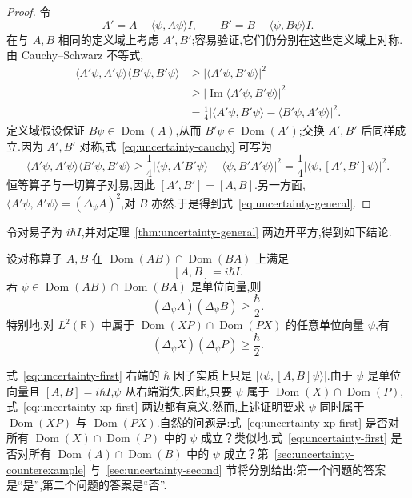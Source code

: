 \begin{proof}
令
\[
A'=A-\langle\psi,A\psi\rangle I,
\qquad
B'=B-\langle\psi,B\psi\rangle I.
\]
在与 $A,B$ 相同的定义域上考虑 $A',B'$;容易验证,它们仍分别在这些定义域上对称.由 Cauchy--Schwarz 不等式,
\begin{align}
\langle A'\psi,A'\psi\rangle\langle B'\psi,B'\psi\rangle
&\geq |\langle A'\psi,B'\psi\rangle|^2 \\
&\geq |\operatorname{Im}\langle A'\psi,B'\psi\rangle|^2 \\
&=\frac14\left|\langle A'\psi,B'\psi\rangle-
\langle B'\psi,A'\psi\rangle\right|^2.
\label{eq:uncertainty-cauchy}
\end{align}
定义域假设保证 $B\psi\in\operatorname{Dom}(A)$,从而 $B'\psi\in\operatorname{Dom}(A')$;交换 $A',B'$ 后同样成立.因为 $A',B'$ 对称,式~\eqref{eq:uncertainty-cauchy} 可写为
\[
\langle A'\psi,A'\psi\rangle\langle B'\psi,B'\psi\rangle
\geq \frac14\left|\langle\psi,A'B'\psi\rangle-
\langle\psi,B'A'\psi\rangle\right|^2
=\frac14\left|\langle\psi,[A',B']\psi\rangle\right|^2.
\]
恒等算子与一切算子对易,因此 $[A',B']=[A,B]$.另一方面,$\langle A'\psi,A'\psi\rangle=(\Delta_\psi A)^2$,对 $B$ 亦然.于是得到式~\eqref{eq:uncertainty-general}.
\end{proof}

令对易子为 $i\hbar I$,并对定理~\ref{thm:uncertainty-general} 两边开平方,得到如下结论.

\begin{corollary}[正则对易关系下的不确定性原理]\label{cor:uncertainty-ccr}
设对称算子 $A,B$ 在 $\operatorname{Dom}(AB)\cap\operatorname{Dom}(BA)$ 上满足
\[
[A,B]=i\hbar I.
\]
若 $\psi\in\operatorname{Dom}(AB)\cap\operatorname{Dom}(BA)$ 是单位向量,则
\[
(\Delta_\psi A)(\Delta_\psi B)\geq \frac{\hbar}{2}.
\label{eq:uncertainty-first}
\]
特别地,对 $L^2(\mathbb R)$ 中属于 $\operatorname{Dom}(XP)\cap\operatorname{Dom}(PX)$ 的任意单位向量 $\psi$,有
\[
(\Delta_\psi X)(\Delta_\psi P)\geq \frac{\hbar}{2}.
\label{eq:uncertainty-xp-first}
\]
\end{corollary}

式~\eqref{eq:uncertainty-first} 右端的 $\hbar$ 因子实质上只是 $|\langle\psi,[A,B]\psi\rangle|$.由于 $\psi$ 是单位向量且 $[A,B]=i\hbar I$,$\psi$ 从右端消失.因此,只要 $\psi$ 属于 $\operatorname{Dom}(X)\cap\operatorname{Dom}(P)$,式~\eqref{eq:uncertainty-xp-first} 两边都有意义.然而,上述证明要求 $\psi$ 同时属于 $\operatorname{Dom}(XP)$ 与 $\operatorname{Dom}(PX)$.自然的问题是:式~\eqref{eq:uncertainty-xp-first} 是否对所有 $\operatorname{Dom}(X)\cap\operatorname{Dom}(P)$ 中的 $\psi$ 成立？类似地,式~\eqref{eq:uncertainty-first} 是否对所有 $\operatorname{Dom}(A)\cap\operatorname{Dom}(B)$ 中的 $\psi$ 成立？第~\ref{sec:uncertainty-counterexample} 与~\ref{sec:uncertainty-second} 节将分别给出:第一个问题的答案是“是”,第二个问题的答案是“否”.

